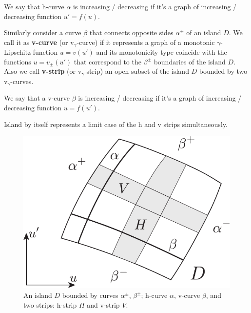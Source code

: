 \begin{remark}
	We say that h-curve $\alpha$ is increasing / decreasing if it's a graph of increasing / decreasing function $u' = f(u)$.
\end{remark}

\begin{definition}
	Similarly consider a curve $\beta$ that connects opposite sides $\alpha^{\pm}$ of an island $D$.
	We call it as {\bf v-curve} (or $\mathrm{v}_{\gamma}$-curve) if it represents a graph of a monotonic $\gamma$-Lipschitz function $u = v(u')$ and its monotonicity type coincide with the functions $u = v_{\pm}(u')$ that correspond to the $\beta^{\pm}$ boundaries of the island $D$.
	Also we call {\bf v-strip} (or $\mathrm{v}_{\gamma}$-strip) an open subset of the island $D$ bounded by two $\mathrm{v}_{\gamma}$-curves.
\end{definition}

\begin{remark}
	We say that a v-curve $\beta$ is increasing / decreasing if it's a graph of increasing / decreasing function $u = f(u')$.
\end{remark}

\begin{remark}
	Island by itself represents a limit case of the h and v strips simultaneously.
\end{remark}

\begin{figure}[h]
\centering
	\includegraphics[scale = 1]{pic/curves and strips}
	\caption{An island $D$ bounded by curves $\alpha^{\pm}$, $\beta^{\pm}$; h-curve $\alpha$, v-curve $\beta$, and two strips: h-strip $H$ and v-strip $V$.}
\label{fig:curves-and-strips}
\end{figure}

